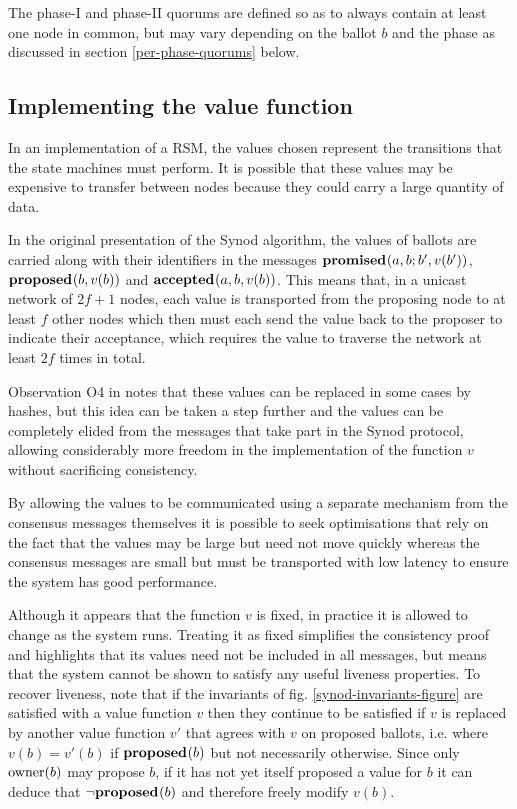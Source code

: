 \documentclass[journal]{IEEEtran}
\begin{document}
The phase-I and phase-II quorums are defined so as to always contain at least
one node in common, but may vary depending on the ballot $b$ and the phase as
discussed in section \ref{per-phase-quorums} below.

\subsection{Implementing the value function}\label{value-function}

In an implementation of a RSM, the values chosen represent the transitions that
the state machines must perform. It is possible that these values may be
expensive to transfer between nodes because they could carry a large quantity
of data.

In the original presentation of the Synod algorithm, the values of ballots are
carried along with their identifiers in the messages $\mathbf{promised}_{}(a,b; b',v(b')
)$, $\mathbf{proposed}_{}( b,v(b))$ and $\mathbf{accepted}_{}(a, b,v(b) )$. This means that, in a unicast
network of $2f + 1$ nodes, each value is transported from the proposing node to
at least $f$ other nodes which then must each send the value back to the
proposer to indicate their acceptance, which requires the value to traverse the
network at least $2f$ times in total.

Observation O4 in \cite{cheap-paxos} notes that these values can be replaced in
some cases by hashes, but this idea can be taken a step further and the values
can be completely elided from the messages that take part in the Synod
protocol, allowing considerably more freedom in the implementation of the
function $v$ without sacrificing consistency.

By allowing the values to be communicated using a separate mechanism from the
consensus messages themselves it is possible to seek optimisations that rely on
the fact that the values may be large but need not move quickly whereas the
consensus messages are small but must be transported with low latency to ensure
the system has good performance.

Although it appears that the function $v$ is fixed, in practice it is allowed
to change as the system runs. Treating it as fixed simplifies the consistency
proof and highlights that its values need not be included in all messages, but
means that the system cannot be shown to satisfy any useful liveness
properties.  To recover liveness, note that if the invariants of fig.
\ref{synod-invariants-figure} are satisfied with a value function $v$ then they
continue to be satisfied if $v$ is replaced by another value function $v'$ that
agrees with $v$ on proposed ballots, i.e. where $v(b) = v'(b)$ if $\mathbf{proposed}_{}(b)$
but not necessarily otherwise. Since only $\mathrm{owner}(b)$ may propose $b$, if it
has not yet itself proposed a value for $b$ it can deduce that $\neg\mathbf{proposed}_{}(b)$
and therefore freely modify $v(b)$.
\end{document}

